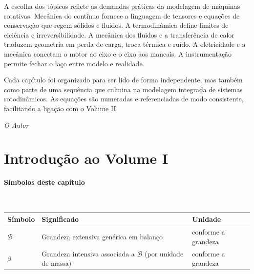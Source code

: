 \documentclass[12pt,a4paper]{article}
\numberwithin{equation}{section}
\numberwithin{table}{section}
\numberwithin{figure}{section}
\begin{document}
A escolha dos tópicos reflete as demandas práticas da modelagem de máquinas
rotativas. Mecânica do contínuo fornece a linguagem de tensores e equações de
conservação que regem sólidos e fluidos. A termodinâmica define limites de
eiciência e irreversibilidade. A mecânica dos fluidos e a transferência de
calor traduzem geometria em perda de carga, troca térmica e ruído. A eletricidade
 e a mecânica conectam o motor ao eixo e o eixo aos mancais. A instrumentação
 permite fechar o laço entre modelo e realidade.

Cada capítulo foi organizado para ser lido de forma independente, mas também
como parte de uma sequência que culmina na modelagem integrada de sistemas
rotodinâmicos. As equações são numeradas e referenciadas de modo consistente,
 facilitando a ligação com o Volume II.

\vspace{1em}
\hfill \textit{O Autor}





\newpage

\section{Introdução ao Volume I}

\paragraph{Símbolos deste capítulo}\mbox{}\\[-0.5em]
{\small
\begin{longtable}{>{\raggedright\arraybackslash}p{2.6cm} >{\raggedright\arraybackslash}p{9.2cm} >{\raggedright\arraybackslash}p{2.6cm}}
	\toprule
	\textbf{Símbolo} & \textbf{Significado} & \textbf{Unidade} \\ \midrule
	\endhead
	$\mathcal{B}$ & Grandeza extensiva genérica em balanço & conforme a grandeza \\
	$\beta$ & Grandeza intensiva associada a $\mathcal{B}$ (por unidade de massa) & conforme a grandeza \\
	\bottomrule
\end{longtable}
}
\end{document}
